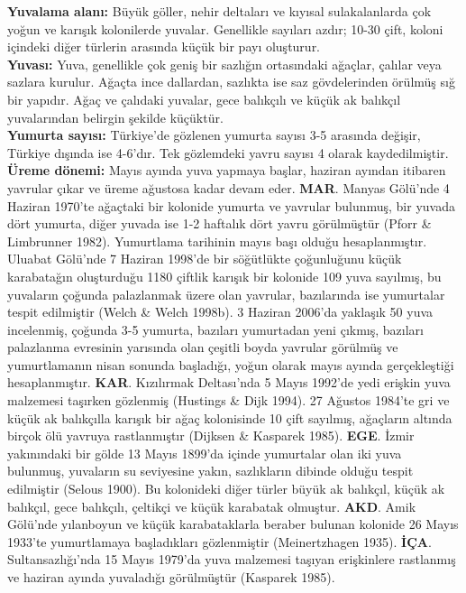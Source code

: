 \documentclass[
  letterpaper,
  DIV=11,
  numbers=noendperiod]{scrreprt}
\begin{document}
\textbf{Yuvalama alanı:} Büyük göller, nehir deltaları ve kıyısal
sulakalanlarda çok yoğun ve karışık kolonilerde yuvalar. Genellikle
sayıları azdır; 10-30 çift, koloni içindeki diğer türlerin arasında
küçük bir payı oluşturur.\\
\textbf{Yuvası:} Yuva, genellikle çok geniş bir sazlığın ortasındaki
ağaçlar, çalılar veya sazlara kurulur. Ağaçta ince dallardan, sazlıkta
ise saz gövdelerinden örülmüş sığ bir yapıdır. Ağaç ve çalıdaki yuvalar,
gece balıkçılı ve küçük ak balıkçıl yuvalarından belirgin şekilde
küçüktür.\\
\textbf{Yumurta sayısı:} Türkiye'de gözlenen yumurta sayısı 3-5 arasında
değişir, Türkiye dışında ise 4-6'dır. Tek gözlemdeki yavru sayısı 4
olarak kaydedilmiştir.\\
\textbf{Üreme dönemi:} Mayıs ayında yuva yapmaya başlar, haziran ayından
itibaren yavrular çıkar ve üreme ağustosa kadar devam eder.
\textbf{MAR}. Manyas Gölü'nde 4 Haziran 1970'te ağaçtaki bir kolonide
yumurta ve yavrular bulunmuş, bir yuvada dört yumurta, diğer yuvada ise
1-2 haftalık dört yavru görülmüştür (Pforr \& Limbrunner 1982).
Yumurtlama tarihinin mayıs başı olduğu hesaplanmıştır. Uluabat Gölü'nde
7 Haziran 1998'de bir söğütlükte çoğunluğunu küçük karabatağın
oluşturduğu 1180 çiftlik karışık bir kolonide 109 yuva sayılmış, bu
yuvaların çoğunda palazlanmak üzere olan yavrular, bazılarında ise
yumurtalar tespit edilmiştir (Welch \& Welch 1998b). 3 Haziran 2006'da
yaklaşık 50 yuva incelenmiş, çoğunda 3-5 yumurta, bazıları yumurtadan
yeni çıkmış, bazıları palazlanma evresinin yarısında olan çeşitli boyda
yavrular görülmüş ve yumurtlamanın nisan sonunda başladığı, yoğun olarak
mayıs ayında gerçekleştiği hesaplanmıştır. \textbf{KAR}. Kızılırmak
Deltası'nda 5 Mayıs 1992'de yedi erişkin yuva malzemesi taşırken
gözlenmiş (Hustings \& Dijk 1994). 27 Ağustos 1984'te gri ve küçük ak
balıkçılla karışık bir ağaç kolonisinde 10 çift sayılmış, ağaçların
altında birçok ölü yavruya rastlanmıştır (Dijksen \& Kasparek 1985).
\textbf{EGE}. İzmir yakınındaki bir gölde 13 Mayıs 1899'da içinde
yumurtalar olan iki yuva bulunmuş, yuvaların su seviyesine yakın,
sazlıkların dibinde olduğu tespit edilmiştir (Selous 1900). Bu
kolonideki diğer türler büyük ak balıkçıl, küçük ak balıkçıl, gece
balıkçılı, çeltikçi ve küçük karabatak olmuştur. \textbf{AKD}. Amik
Gölü'nde yılanboyun ve küçük karabataklarla beraber bulunan kolonide 26
Mayıs 1933'te yumurtlamaya başladıkları gözlenmiştir (Meinertzhagen
1935). \textbf{İÇA}. Sultansazlığı'nda 15 Mayıs 1979'da yuva malzemesi
taşıyan erişkinlere rastlanmış ve haziran ayında yuvaladığı görülmüştür
(Kasparek 1985).
\end{document}
